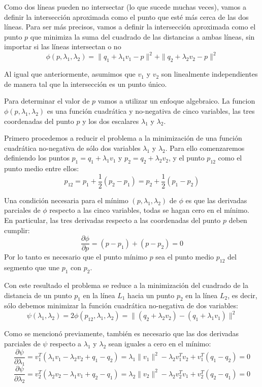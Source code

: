 Como dos líneas pueden no intersectar (lo que sucede muchas veces), vamos a definir la intersección aproximada como el punto que esté más cerca de las dos líneas. Para ser más precisos, vamos a definir la intersección aproximada como el punto $p$ que minimiza la suma del cuadrado de las distancias a ambas líneas, sin importar si las líneas intersectan o no
    \[ \phi(p, \lambda_1, \lambda_2) = \| q_1 + \lambda_1 v_1 - p \|^2 + \| q_2 + \lambda_2 v_2 - p \|^2  \]
    
Al igual que anteriormente, asumimos que $v_1$ y $v_2$ son linealmente independientes de manera tal que la intersección es un punto único.

Para determinar el valor de $p$ vamos a utilizar un enfoque algebraico. La funcion $\phi(p, \lambda_1, \lambda_2)$ es una función cuadrática y no-negativa de cinco variables, las tres coordenadas del punto $p$ y los dos escalares $\lambda_1$ y $\lambda_2$.

Primero procedemos a reducir el problema a la minimización de una función cuadrática no-negativa de sólo dos variables $\lambda_1$ y $\lambda_2$. 
Para ello comenzaremos definiendo los puntos $p_1 = q_1 + \lambda_1 v_1$ y $p_2 = q_2 + \lambda_2 v_2$, y el punto $p_{12}$ como el punto medio entre ellos:
    \[ p_{12} = p_1 + \frac{1}{2} (p_2 - p_1) = p_2 + \frac{1}{2} (p_1 - p_2) \]

Una condición necesaria para el mínimo $(p, \lambda_1, \lambda_2)$ de $\phi$ es que las derivadas parciales de $\phi$ respecto a las cinco variables, todas se hagan cero en el mínimo. En particular, las tres derivadas respecto a las coordenadas del punto $p$ deben cumplir:
    \[ \frac{\partial \phi}{\partial p} = (p - p_1) + (p - p_2) = 0 \]
Por lo tanto es necesario que el punto mínimo $p$ sea el punto medio $p_{12}$ del segmento que une $p_1$ con $p_2$.

Con este resultado el problema se reduce a la minimización del cuadrado de la distancia de un punto $p_1$ en la línea $L_1$ hacia un punto $p_2$ en la línea $L_2$, es decir, sólo debemos minimizar la función cuadrática no-negativa de dos variables:
    \[ \psi  (\lambda_1, \lambda_2) = 2 \phi(p_{12}, \lambda_1, \lambda_2) = \| (q_2 + \lambda_2 v_2) - (q_1 + \lambda_1 v_1) \| ^2 \]
    
Como se mencionó previamente, también es necesario que las dos derivadas parciales de $\psi$ respecto a $\lambda_1$ y $\lambda_2$ sean iguales a cero en el mínimo:
    \[ \frac{\partial \psi}{\partial \lambda_1} = v_1^T (\lambda_1 v_1 - \lambda_2 v_2 + q_1 - q_2) = \lambda_1 \| v_1 \|^2 - \lambda_2 v_1^T v_2 + v_1^T (q_1 - q_2) = 0 \]
    \[ \frac{\partial \psi}{\partial \lambda_2} = v_2^T (\lambda_2 v_2 - \lambda_1 v_1 + q_2 - q_1) = \lambda_2 \| v_2 \|^2 - \lambda_2 v_2^T v_1 + v_2^T (q_2 - q_1) = 0 \]

